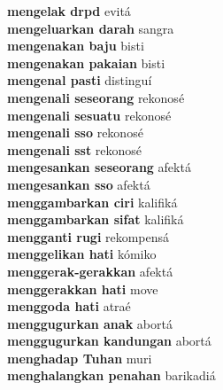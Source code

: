 \textbf{ mengelak drpd  } evitá \\
\textbf{ mengeluarkan darah  } sangra \\
\textbf{ mengenakan baju  } bisti \\
\textbf{ mengenakan pakaian  } bisti \\
\textbf{ mengenal pasti  } distinguí \\
\textbf{ mengenali seseorang  } rekonosé \\
\textbf{ mengenali sesuatu  } rekonosé \\
\textbf{ mengenali sso  } rekonosé \\
\textbf{ mengenali sst  } rekonosé \\
\textbf{ mengesankan seseorang  } afektá \\
\textbf{ mengesankan sso  } afektá \\
\textbf{ menggambarkan ciri  } kalifiká \\
\textbf{ menggambarkan sifat  } kalifiká \\
\textbf{ mengganti rugi  } rekompensá \\
\textbf{ menggelikan hati  } kómiko \\
\textbf{ menggerak-gerakkan  } afektá \\
\textbf{ menggerakkan hati  } move \\
\textbf{ menggoda hati  } atraé \\
\textbf{ menggugurkan anak  } abortá \\
\textbf{ menggugurkan kandungan  } abortá \\
\textbf{ menghadap Tuhan  } muri \\
\textbf{ menghalangkan penahan  } barikadiá \\
